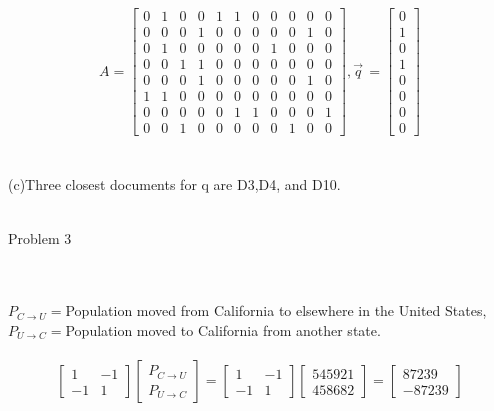 \documentclass{article}
\begin{document}
\[A=\begin{bmatrix}
0 & 1 & 0 & 0 & 1 & 1 & 0 & 0 & 0 & 0 & 0 \\
0 & 0 & 0 & 1 & 0 & 0 & 0 & 0 & 0 & 1 & 0 \\
0 & 1 & 0 & 0 & 0 & 0 & 0 & 1 & 0 & 0 & 0 \\
0 & 0 & 1 & 1 & 0 & 0 & 0 & 0 & 0 & 0 & 0 \\
0 & 0 & 0 & 1 & 0 & 0 & 0 & 0 & 0 & 1 & 0 \\
1 & 1 & 0 & 0 & 0 & 0 & 0 & 0 & 0 & 0 & 0 \\
0 & 0 & 0 & 0 & 0 & 1 & 1 & 0 & 0 & 0 & 1 \\
0 & 0 & 1 & 0 & 0 & 0 & 0 & 0 & 1 & 0 & 0
\end{bmatrix}, 
\vec{q}^{\,}=\begin{bmatrix}0\\1\\0\\1\\0\\0\\0\\0\end{bmatrix}
\]
\\\\(c)Three closest documents for q are D3,D4, and D10.
\\\\\begin{large}Problem 3\end{large}
\\\\$P_{C\rightarrow U}=$Population moved from California to elsewhere in the United States, $P_{U\rightarrow C}=$Population moved to California from another state.
\\\\\[\begin{bmatrix}
1 & -1\\
-1 & 1
\end{bmatrix}
\begin{bmatrix}
P_{C\rightarrow U}\\
P_{U\rightarrow C}
\end{bmatrix}
=\begin{bmatrix}
1 & -1\\
-1 & 1
\end{bmatrix}
\begin{bmatrix}
545921\\
458682
\end{bmatrix}
=\begin{bmatrix}
87239\\
-87239
\end{bmatrix}
\]
\end{document}
